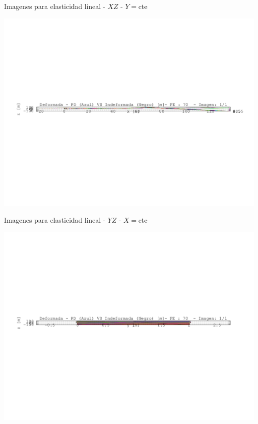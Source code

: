 \documentclass[a4paper,11pt]{article}
\begin{document}
\begin{center}       
Imagenes para elasticidad lineal -  $XZ$ - $Y=\text{cte}$ 

\includegraphics[width=.80\textwidth]{../../XY_XZ_YZ/XZ/deformada/grua_deformada_XZ_1.png}      

\end{center}       
\newpage       
\begin{center}       
Imagenes para elasticidad lineal -  $YZ$ - $X=\text{cte}$ 

\includegraphics[width=.80\textwidth]{../../XY_XZ_YZ/YZ/deformada/grua_deformada_YZ_1.png}      

\end{center}       
\end{document}
